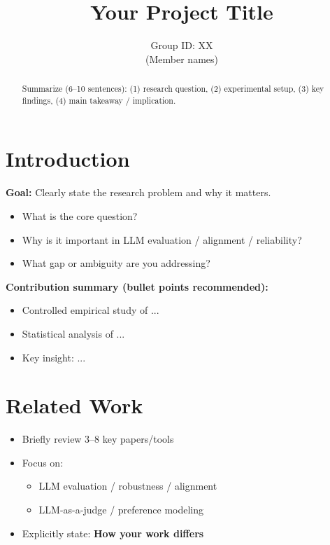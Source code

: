 \documentclass[11pt]{article}
\title{\textbf{Your Project Title}}
\author{Group ID: XX \\ (Member names)}
\date{}
\begin{document}
\maketitle
\vspace{-1em}

\begin{abstract}
Summarize (6--10 sentences):
(1) research question,
(2) experimental setup,
(3) key findings,
(4) main takeaway / implication.
\end{abstract}

\section{Introduction}

\textbf{Goal:} Clearly state the research problem and why it matters.

\begin{itemize}[leftmargin=*]
    \item What is the core question?
    \item Why is it important in LLM evaluation / alignment / reliability?
    \item What gap or ambiguity are you addressing?
\end{itemize}

\textbf{Contribution summary (bullet points recommended):}
\begin{itemize}
    \item Controlled empirical study of ...
    \item Statistical analysis of ...
    \item Key insight: ...
\end{itemize}

\section{Related Work}

\begin{itemize}[leftmargin=*]
    \item Briefly review 3--8 key papers/tools
    \item Focus on:
    \begin{itemize}
        \item LLM evaluation / robustness / alignment
        \item LLM-as-a-judge / preference modeling
    \end{itemize}
    \item Explicitly state:
    \textbf{How your work differs}
\end{itemize}
\end{document}

